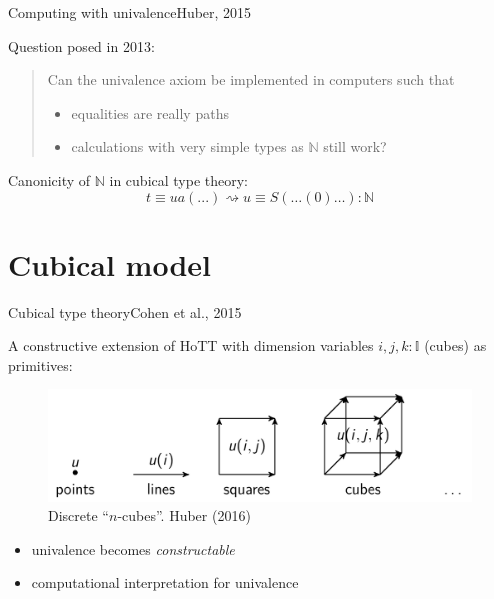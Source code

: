 \documentclass[english,handout]{beamer}
\begin{document}
\begin{frame}{Computing with univalence}{Huber, 2015}

Question posed in 2013:

\begin{quotation}
Can the univalence axiom be implemented in computers such that
\begin{itemize} 
 \item equalities are really paths 
 \item calculations with very simple types as $\mathbb{N}$ still work?
 \end{itemize}
\end{quotation}

Canonicity of $\mathbb{N}$ in cubical type theory:
$$ t \equiv ua ( ... )  \rightsquigarrow u \equiv S ( \dots ( 0 ) \ldots ) : \mathbb{N}  $$



% 


\end{frame}




\section{Cubical model}

\begin{frame}{Cubical type theory}{Cohen et al., 2015}

A constructive extension of HoTT with dimension variables $i,j,k : \mathbb{I}$ (cubes) as primitives:

\begin{figure}[h!]
    \includegraphics[width=.7\textwidth]{figures/cubes.png}
    \caption{Discrete ``$n$-cubes''. Huber (2016)}
\end{figure}


\begin{itemize}
\item univalence becomes \emph{constructable}
\item computational interpretation for univalence 
\end{itemize}

\end{frame}
\end{document}
